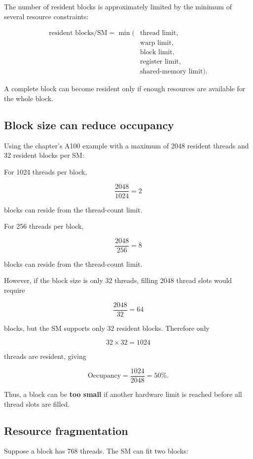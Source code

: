 \documentclass[11pt,a4paper]{article}
\begin{document}
The number of resident blocks is approximately limited by the minimum of several resource constraints:

\[
\begin{aligned}
\text{resident blocks/SM}
=
\min(
&\text{thread limit},\\
&\text{warp limit},\\
&\text{block limit},\\
&\text{register limit},\\
&\text{shared-memory limit}
).
\end{aligned}
\]

A complete block can become resident only if enough resources are available for the whole block.

\subsection{Block size can reduce occupancy}

Using the chapter's A100 example with a maximum of 2048 resident threads and 32 resident blocks per SM:

For 1024 threads per block,

\[
\frac{2048}{1024}=2
\]

blocks can reside from the thread-count limit.

For 256 threads per block,

\[
\frac{2048}{256}=8
\]

blocks can reside from the thread-count limit.

However, if the block size is only 32 threads, filling 2048 thread slots would require

\[
\frac{2048}{32}=64
\]

blocks, but the SM supports only 32 resident blocks. Therefore only

\[
32\times32=1024
\]

threads are resident, giving

\[
\text{Occupancy}
=
\frac{1024}{2048}
=
50\%.
\]

Thus, a block can be \textbf{too small} if another hardware limit is reached before all thread slots are filled.

\subsection{Resource fragmentation}

Suppose a block has 768 threads. The SM can fit two blocks:
\end{document}
